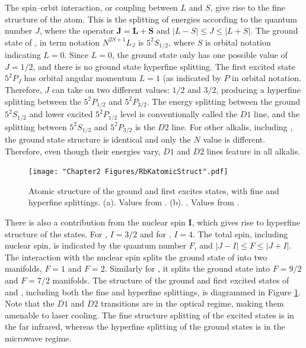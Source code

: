 The spin--orbit interaction, or coupling between $L$ and $S$, give rise to the fine structure of the atom. This is the splitting of energies according to the quantum number $J$, where the operator $\textbf{J}=\textbf{L}+\textbf{S}$ and $|L - S| \leq J \leq |L + S|$.  The ground state of \Rb{}, in term notation $N^{2S+1}L_J$ is $5^2S_{1/2}$, where $S$ is orbital notation indicating $L=0$. Since $L=0$, the ground state only has one possible value of $J=1/2$, and there is no ground state hyperfine splitting. The first excited state $5^2P_J$ has orbital angular momentum $L=1$ (as indicated by $P$ in orbital notation. Therefore, $J$ can take on two different values: $1/2$ and $3/2$, producing a hyperfine splitting between the $5^2P_{1/2}$ and $5^2P_{3/2}$. The energy splitting between the ground $5^2S_{1/2}$ and lower excited $5^2P_{1/2}$ level is conventionally called the $D1$ line, and the splitting between $5^2S_{1/2}$ and  $5^2P_{3/2}$ is the $D2$ line. For other alkalis, including \K{}, the ground state structure is identical and only the $N$ value is different. Therefore, even though their energies vary, $D1$ and $D2$ lines feature in all alkalis.

\begin{figure}
	\texttt{[image: "Chapter2 Figures/RbKatomicStruct".pdf]}
\caption[Atomic structure of the ground and first excites states]{Atomic structure of the ground and first excites states, with fine and hyperfine splittings. (a)\Rb{}. Values from \cite{Steck}. (b). \K{}. Values from \cite{Tiecke}.}
\label{fig:RbKatomicStruct}
\end{figure}

There is also a contribution from the nuclear spin $\mathbf{I}$, which gives rise to hyperfine structure of the states. For \Rb{}, $I=3/2$ and for \K{}, $I=4$. The total spin, including nuclear spin, is indicated by the quantum number $F$, and $|J - I| \leq F \leq |J + I|$. The interaction with the nuclear spin splits the ground state of \Rb{} into two manifolds, $F=1$ and $F=2$. Similarly for \K{}, it splits the ground state into $F=9/2$ and $F=7/2$ manifolds. The structure of the ground and first excited states of \Rb{} and \K{}, including both the fine and hyperfine splittings, is diagrammed in Figure \ref{fig:RbKatomicStruct}. Note that the $D1$ and $D2$ transitions are in the optical regime, making them amenable to laser cooling. The fine structure splitting of the excited states is in the far infrared, whereas the hyperfine splitting of the ground states is in the microwave regime.  

